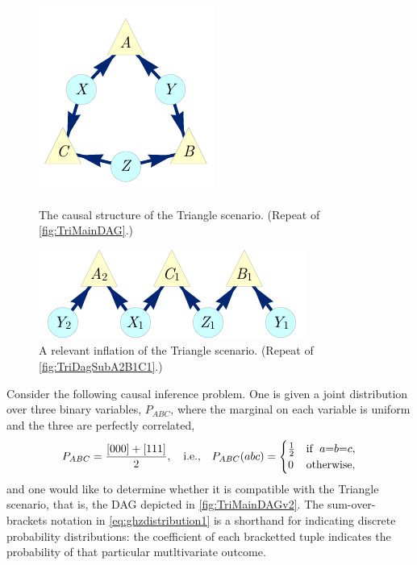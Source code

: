 
\par\smallskip\nobreak
\begin{figure}[bh]
\centering
\begin{minipage}[t]{0.45\linewidth}
\centering
\includegraphics[scale=1]{TriDagRawALT.pdf}
\caption{The causal structure of the Triangle scenario. (Repeat of \cref{fig:TriMainDAG}.)}\label{fig:TriMainDAGv2}
\end{minipage}
\hfill
\begin{minipage}[t]{0.45\linewidth}
\centering
\includegraphics[scale=1]{TriDagSubA2B1C1.pdf}
\caption{A relevant inflation of the Triangle scenario. (Repeat of \cref{fig:TriDagSubA2B1C1}.)}\label{fig:TriDagSubA2B1C1v2}
\end{minipage}
\end{figure}


Consider the following causal inference problem.  One is given a joint distribution over three binary variables, $P_{A B C}$, where the marginal on each variable is uniform and the three are perfectly correlated,
\begin{align}\label{eq:ghzdistribution1}
P_{A B C} =\frac{[000]+[111]}{2},\quad\text{i.e.,}\quad P_{A B C}(a b c)=\begin{cases}\tfrac{1}{2}&\text{if }\; a\mathord{=} b\mathord{=} c, \\ 0&\text{otherwise},\end{cases}
\end{align}
and one would like to determine whether it is compatible with the Triangle scenario, that is, the DAG depicted in \cref{fig:TriMainDAGv2}.  The sum-over-brackets notation in \cref{eq:ghzdistribution1} is a shorthand for indicating discrete probability distributions: the coefficient of each bracketted tuple indicates the probability of that particular mutltivariate outcome.

